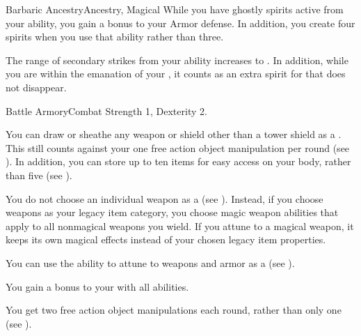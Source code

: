 \begin{magicalfeat}{Barbaric Ancestry}{Ancestry, Magical}
         While you have ghostly spirits active from your  ability, you gain a  bonus to your Armor defense.
        In addition, you create four spirits when you use that ability rather than three.

         The range of secondary strikes from your  ability increases to \shortrange.
        In addition, while you are within the emanation of your , it counts as an extra spirit for  that does not disappear.
    \end{magicalfeat}

    \begin{feat}{Battle Armory}{Combat}
        \featpre Strength 1, Dexterity 2.

         You can draw or sheathe any weapon or shield other than a tower shield as a .
        This still counts against your one free action object manipulation per round (see ).
        In addition, you can store up to ten items for easy access on your body, rather than five (see ).

         You do not choose an individual weapon as a  (see ).
        Instead, if you choose weapons as your legacy item category, you choose magic weapon abilities that apply to all nonmagical weapons you wield.
        If you attune to a magical weapon, it keeps its own magical effects instead of your chosen legacy item properties.

         You can use the  ability to attune to weapons and armor as a  (see ).

         You gain a  bonus to your  with all abilities.

         You get two free action object manipulations each round, rather than only one (see ).
    \end{feat}

